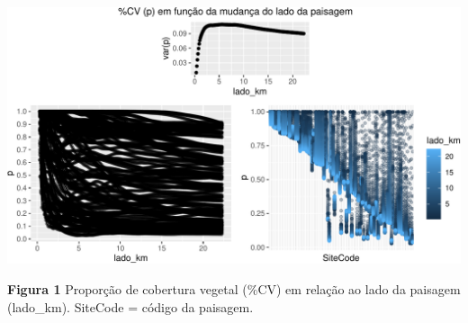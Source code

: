 \documentclass{article}
\begin{document}
\includegraphics{EfeitoEscala_files/figure-latex/figura p por lado da paisagem-1.pdf}

\textbf{Figura 1} Proporção de cobertura vegetal (\%CV) em relação ao
lado da paisagem (lado\_km). SiteCode = código da paisagem.



\end{document}
